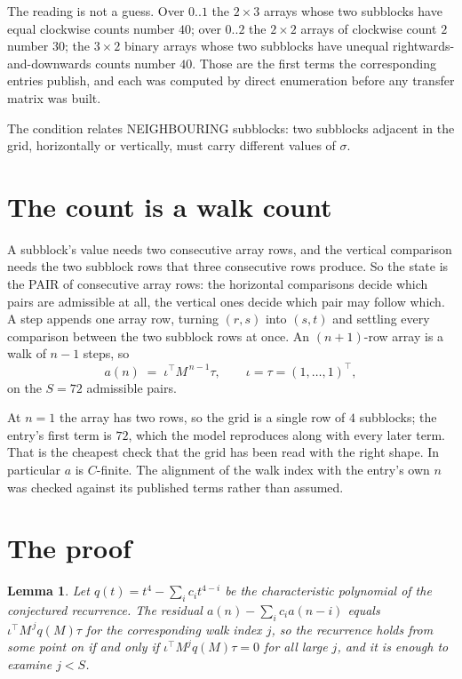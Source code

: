 \documentclass[11pt,a4paper]{article}
\theoremstyle{plain}
\newtheorem{lemma}[theorem]{Lemma}
\theoremstyle{definition}
\begin{document}
The reading is not a guess. Over $0..1$ the $2\times3$ arrays whose two subblocks have equal
clockwise counts number $40$; over $0..2$ the $2\times2$ arrays of clockwise count $2$ number
$30$; the $3\times2$ binary arrays whose two subblocks have unequal rightwards-and-downwards
counts number $40$. Those are the first terms the corresponding entries publish, and each was
computed by direct enumeration before any transfer matrix was built.

The condition relates NEIGHBOURING subblocks: two subblocks adjacent in the grid, horizontally
or vertically, must carry different values of $\sigma$.

\section{The count is a walk count}

A subblock's value needs two consecutive array rows, and the vertical
comparison needs the two subblock rows that three consecutive rows produce. So the state is the
PAIR of consecutive array rows: the horizontal comparisons decide which pairs are admissible at
all, the vertical ones decide which pair may follow which. A step appends one array row,
turning $(r,s)$ into $(s,t)$ and settling every comparison between the two subblock rows at
once. An $(n+1)$-row array is a walk of $n-1$ steps, so
\[
a(n)\;=\;\iota^{\!\top}M^{\,n-1}\tau,\qquad\iota=\tau=(1,\dots,1)^{\!\top},
\]
on the $S=72$ admissible pairs.

At $n=1$ the array has two rows, so the grid is a single row of $4$
subblocks; the entry's first term is $72$, which the model
reproduces along with every later term. That is the cheapest check that the grid has been read
with the right shape.
In particular $a$ is $C$-finite. The alignment of the walk index with the entry's own $n$ was
checked against its published terms rather than assumed.

\section{The proof}

\begin{lemma}\label{lem:crit}
Let $q(t)=t^{4}-\sum_i c_it^{4-i}$ be the characteristic polynomial of the
conjectured recurrence. The residual $a(n)-\sum_ic_ia(n-i)$ equals
$\iota^{\!\top}M^{\,j}q(M)\tau$ for the corresponding walk index $j$, so the recurrence
holds from some point on if and only if $\iota^{\!\top}M^{j}q(M)\tau=0$ for all large $j$,
and it is enough to examine $j<S$.
\end{lemma}
\end{document}
